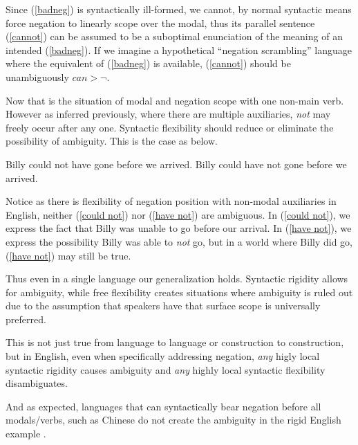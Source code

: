 \documentclass{article}
\begin{document}
\begin{exe}
\end{exe}

Since (\ref{badneg}) is syntactically ill-formed, we cannot, by normal syntactic means force negation to linearly scope over the modal, thus its parallel sentence (\ref{cannot}) can be assumed to be a suboptimal enunciation of the meaning of an intended (\ref{badneg}). If we imagine a hypothetical ``negation scrambling'' language where the equivalent of (\ref{badneg}) is available, (\ref{cannot}) should be unambiguously $can > \neg$.

Now that is the situation of modal and negation scope with one non-main verb. However as inferred previously, where there are multiple auxiliaries, \emph{not} may freely occur after any one. Syntactic flexibility should reduce or eliminate the possibility of ambiguity. This is the case as below.

\begin{exe}
\ex Billy could not have gone before we arrived.\label{could not}
\ex Billy could have not gone before we arrived.\label{have not}
\end{exe}

Notice as there is flexibility of negation position with non-modal auxiliaries in English, neither (\ref{could not}) nor (\ref{have not}) are ambiguous. In (\ref{could not}), we express the fact that Billy was unable to go before our arrival. In (\ref{have not}), we express the possibility Billy was able to \emph{not} go, but in a world where Billy did go, (\ref{have not}) may still be true.


Thus even in a single language our generalization holds.
Syntactic rigidity allows for ambiguity, while free flexibility creates situations where ambiguity is ruled out due to the assumption that speakers have that surface scope is universally preferred.

This is not just true from language to language or construction to construction, but in English, even when specifically addressing negation, \emph{any} higly local syntactic rigidity causes ambiguity and \emph{any} highly local syntactic flexibility disambiguates.

And as expected, languages that can syntactically bear negation before all modals/verbs, such as Chinese do not create the ambiguity in the rigid English example \parencite{ernst98}.
\end{document}
